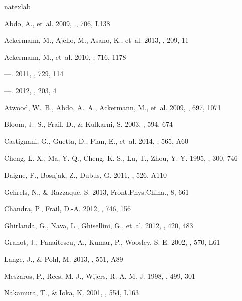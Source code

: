 \documentclass[manuscript]{aastex}
\begin{document}
\begin{thebibliography}{}
\expandafter\ifx\csname natexlab\endcsname\relax\def\natexlab#1{#1}\fi

Abdo, A., {et~al.} 2009, \apj., 706, L138

Ackermann, M., Ajello, M., Asano, K., {et~al.} 2013, \apjs, 209,
  11

Ackermann, M., {et~al.} 2010, \apj, 716, 1178

---. 2011, \apj, 729, 114

---. 2012, \apjs, 203, 4

{Atwood}, W.~B., {Abdo}, A.~A., {Ackermann}, M., {et~al.} 2009, \apj,
  697, 1071

Bloom, J.~S., Frail, D., \& Kulkarni, S. 2003, \apj, 594, 674

Castignani, G., Guetta, D., Pian, E., {et~al.} 2014, \aap, 565,
  A60

Cheng, L.-X., Ma, Y.-Q., Cheng, K.-S., Lu, T., Zhou, Y.-Y. 1995, \aap, 300, 746

Daigne, F., Bosnjak, Z., Dubus, G. 2011, \aap, 526, A110

Gehrels, N., \& Razzaque, S. 2013, Front.Phys.China., 8, 661

Chandra, P., Frail, D.-A. 2012, \apj, 746, 156

Ghirlanda, G., Nava, L., Ghisellini, G., {et~al.} 2012,
  \mnras, 420, 483

Granot, J., Panaitescu, A., Kumar, P., Woosley, S.-E. 2002, \apjl, 570, L61

Lange, J., \& Pohl, M. 2013, \aap, 551, A89

Meszaros, P., Rees, M.-J., Wijers, R.-A.-M.-J. 1998, \apj, 499, 301

Nakamura, T., \& Ioka, K. 2001, \apj, 554, L163


\end{thebibliography}
\end{document}
